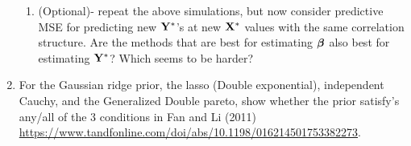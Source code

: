 \documentclass{article}\usepackage[]{graphicx}\usepackage[]{color}
\begin{document}
\begin{enumerate}
\begin{enumerate}
\item  (Optional)- repeat the above simulations, but now consider predictive MSE for  predicting new $\mathbf{Y}^*$'s at new $\mathbf{X}^*$ values with the same correlation  structure.  Are the methods that are best for estimating $\boldsymbol{\beta}$ also  best for estimating $\mathbf{Y}^*$?   Which seems to be harder?

\end{enumerate}

\item  For  the Gaussian ridge prior,  the lasso (Double exponential), independent Cauchy,  and the Generalized Double pareto, show whether the prior satisfy's any/all of the 3 conditions in Fan and Li (2011) \url{https://www.tandfonline.com/doi/abs/10.1198/016214501753382273}.

\end{enumerate}
\end{document}
